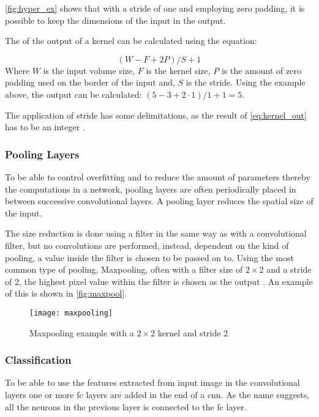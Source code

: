 \autoref{fig:hyper_ex} shows that with a stride of one and employing zero padding, it is possible to keep the dimensions of the input in the output.

The of the output of a kernel can be calculated using the equation:

\begin{equation}\label{eq:kernel_out}
	(W-F+2P)/S+1
\end{equation}
Where $ W $ is the input volume size, $F$ is the kernel size, $P$ is the amount of zero padding used on the border of the input and, $S$ is the stride. Using the example above, the output can be calculated: $(5-3+2\cdot1)/1+1=5$.

The application of stride has some delimitations, as the result of \autoref{eq:kernel_out} has to be an integer \citep{Karpathy2016b}.\\

\subsubsection{Pooling Layers}
To be able to control overfitting and to reduce the amount of parameters thereby the computations in a network, pooling layers are often periodically placed in between successive convolutional layers. A pooling layer reduces the spatial size of the input.

The size reduction is done using a filter in the same way as with a convolutional filter, but no convolutions are performed, instead, dependent on the kind of pooling, a value inside the filter is chosen to be passed on to. Using the most common type of pooling, Maxpooling, often with a filter size of $2\times2$ and a stride of 2, the highest pixel value within the filter is chosen as the output \citep{Karpathy2016b}. An example of this is shown in \autoref{fig:maxpool}.

\begin{figure}[H]
	\centering
	\texttt{[image: maxpooling]}
	\caption{Maxpooling example with a $2\times2$ kernel and stride 2 \citep{Karpathy2016b}}
	\label{fig:maxpool}
\end{figure}

\subsubsection{Classification}
To be able to use the features extracted from input image in the convolutional layers one or more \gls{fc} layers are added in the end of a \gls{cnn}. As the name suggests, all the neurons in the previous layer is connected to the \gls{fc} layer.

